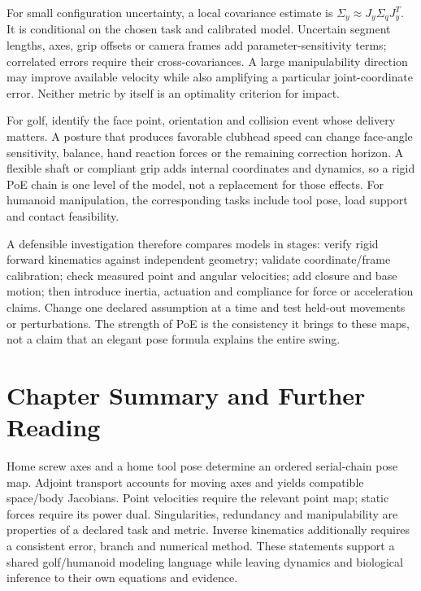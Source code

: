 For small configuration uncertainty, a local covariance estimate is $\Sigma_y\approx J_y\Sigma_qJ_y^T$. It is conditional on the chosen task and calibrated model. Uncertain segment lengths, axes, grip offsets or camera frames add parameter-sensitivity terms; correlated errors require their cross-covariances. A large manipulability direction may improve available velocity while also amplifying a particular joint-coordinate error. Neither metric by itself is an optimality criterion for impact.

For golf, identify the face point, orientation and collision event whose delivery matters. A posture that produces favorable clubhead speed can change face-angle sensitivity, balance, hand reaction forces or the remaining correction horizon. A flexible shaft or compliant grip adds internal coordinates and dynamics, so a rigid PoE chain is one level of the model, not a replacement for those effects. For humanoid manipulation, the corresponding tasks include tool pose, load support and contact feasibility.

A defensible investigation therefore compares models in stages: verify rigid forward kinematics against independent geometry; validate coordinate/frame calibration; check measured point and angular velocities; add closure and base motion; then introduce inertia, actuation and compliance for force or acceleration claims. Change one declared assumption at a time and test held-out movements or perturbations. The strength of PoE is the consistency it brings to these maps, not a claim that an elegant pose formula explains the entire swing.

\section{Chapter Summary and Further Reading}
\label{sec:ch9_summary}\label{sec:ch9_further_reading}

Home screw axes and a home tool pose determine an ordered serial-chain pose map. Adjoint transport accounts for moving axes and yields compatible space/body Jacobians. Point velocities require the relevant point map; static forces require its power dual. Singularities, redundancy and manipulability are properties of a declared task and metric. Inverse kinematics additionally requires a consistent error, branch and numerical method. These statements support a shared golf/humanoid modeling language while leaving dynamics and biological inference to their own equations and evidence.

